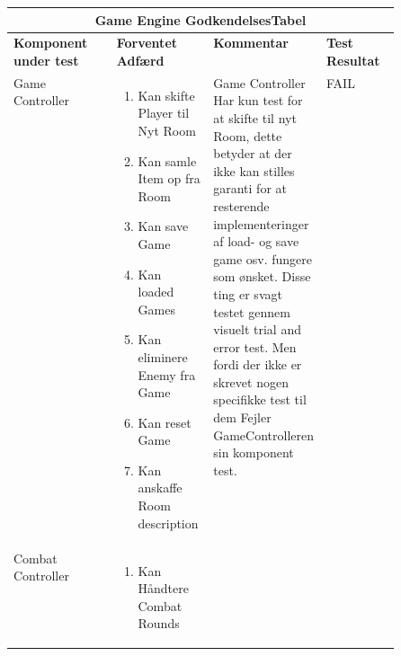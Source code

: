 \begin{center}
\begin{longtable}{|l|p{0.25\linewidth}|p{0.25\linewidth}|l|}
  \hline
  \multicolumn{4}{|c|}{\textbf{Game Engine GodkendelsesTabel}} \\ \hline
  \textbf{Komponent under test} & \textbf{Forventet Adfærd} & \textbf{Kommentar} & \textbf{Test Resultat} \\ \hline
  Game Controller
  &
    \begin{enumerate}
      \item \begin{flushleft} Kan skifte Player til Nyt Room \end{flushleft}
      \item \begin{flushleft} Kan samle Item op fra Room  \end{flushleft}
      \item \begin{flushleft} Kan save Game \end{flushleft}
      \item \begin{flushleft} Kan loaded Games \end{flushleft}
      \item \begin{flushleft} Kan eliminere Enemy fra Game \end{flushleft}
      \item \begin{flushleft} Kan reset Game \end{flushleft}
      \item \begin{flushleft} Kan anskaffe Room description \end{flushleft}
    \end{enumerate}
  &
  \flushleft 
  Game Controller Har kun test for at skifte til nyt Room, dette betyder at der 
  ikke kan stilles garanti for at resterende implementeringer af load- og save game
  osv. fungere som ønsket. Disse ting er svagt testet gennem visuelt trial and error
  test. Men fordi der ikke er skrevet nogen specifikke test til dem Fejler 
  GameControlleren sin komponent test.
  &
  FAIL
  \\ \hline
  Combat Controller
  &
  \begin{enumerate}
    \item \begin{flushleft} Kan Håndtere Combat Rounds \end{flushleft}

\end{enumerate}
\end{longtable}
\end{center}
